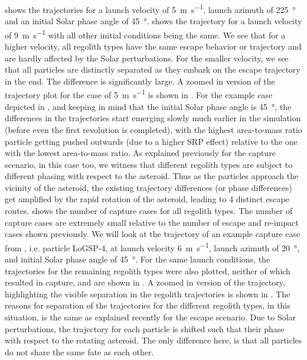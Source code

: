 shows the trajectories for a launch velocity of \SI{5}{\metre\per\second}, launch azimuth of \SI{225}{\degree} and an initial Solar phase angle of \SI{45}{\degree}.  shows the trajectory for a launch velocity of \SI{9}{\metre\per\second} with all other initial conditions being the same. We see that for a higher velocity, all regolith types have the same escape behavior or trajectory and are hardly affected by the Solar perturbations. For the smaller velocity, we see that all particles are distinctly separated as they embark on the escape trajectory in the end. The difference is significantly large. A zoomed in version of the trajectory plot for the case of \SI{5}{\metre\per\second} is shown in . For the example case depicted in , and keeping in mind that the initial Solar phase angle is \SI{45}{\degree}, the differences in the trajectories start emerging slowly much earlier in the simulation (before even the first revolution is completed), with the highest area-to-mass ratio particle getting pushed outwards (due to a higher \gls{SRP} effect) relative to the one with the lowest area-to-mass ratio. As explained previously for the capture scenario, in this case too, we witness that different regolith types are subject to different phasing with respect to the asteroid. Thus as the particles approach the vicinity of the asteroid, the existing trajectory differences (or phase differences) get amplified by the rapid rotation of the asteroid, leading to 4 distinct escape routes.
%
\newline\newline
%
 shows the number of capture cases for all regolith types. The number of capture cases are extremely small relative to the number of escape and re-impact cases shown previously. We will look at the trajectory of an example capture case from , i.e. particle LoGSP-4, at launch velocity \SI{6}{\metre\per\second}, launch azimuth of \SI{20}{\degree}, and initial Solar phase angle of \SI{45}{\degree}. For the same launch conditions, the trajectories for the remaining regolith types were also plotted, neither of which resulted in capture, and are shown in . A zoomed in version of the trajectory, highlighting the visible separation in the regolith trajectories is shown in . The reasons for separation of the trajectories for the different regolith types, in this situation, is the same as explained recently for the escape scenario. Due to Solar perturbations, the trajectory for each particle is shifted such that their phase with respect to the rotating asteroid. The only difference here, is that all particles do not share the same fate as each other.
